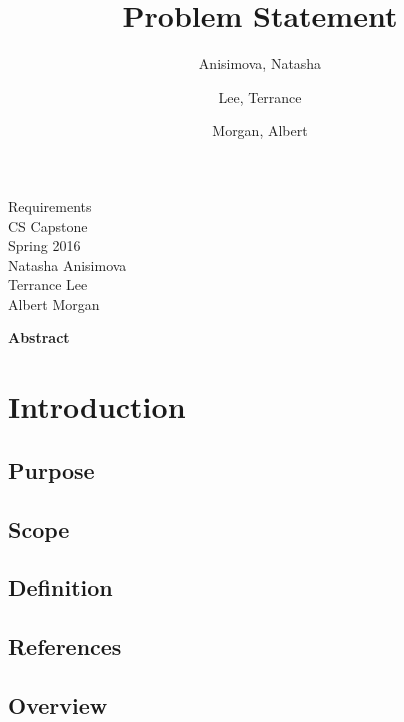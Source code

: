 \documentclass[10pt,journal,draftclsnofoot,onecolumn]{IEEEtran}
\begin{document}
	\singlespace
	
	\title{\vspace{2in}Problem Statement}
	
	\author {
		Anisimova, Natasha
		\and
		Lee, Terrance
		\and
		Morgan, Albert
	}
	
	
	\pagestyle{empty}
	\vspace*{2in}
	\begin{center}
		\huge
		Requirements\\
		\normalsize
		\vspace{5mm}
		CS Capstone\\
		Spring 2016\\
		\vspace{5mm}
		Natasha Anisimova\\
		Terrance Lee\\
		Albert Morgan
	\end{center}
	
	\vspace{5mm}
	
	\begin{center}
		\textbf{Abstract}
	\end{center}
	
	\begin{adjustwidth}{2in}{2in}
	
	
	\end{adjustwidth}
	
	\newpage
	\pagestyle{headings}


	\section{Introduction}
	\subsection{Purpose}
	\subsection{Scope}
	\subsection{Definition}
	\subsection{References}
	\subsection{Overview}
	
\end{document}
